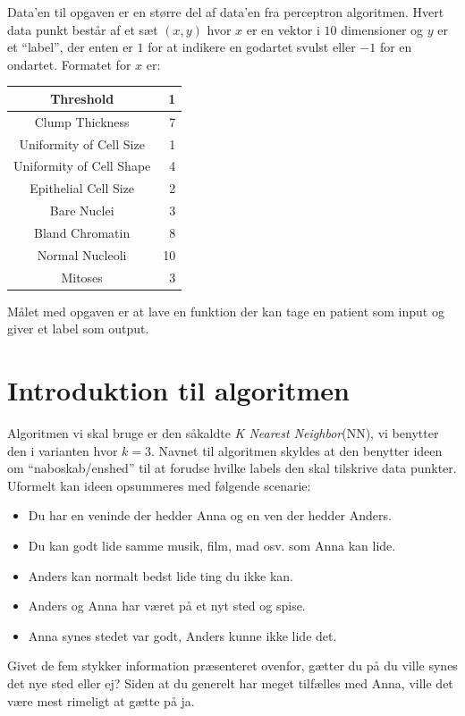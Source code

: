 \documentclass[14pt]{article}
\begin{document}
Data'en til opgaven er en større del af data'en fra perceptron algoritmen.
Hvert data punkt består af et sæt $(x, y)$ hvor $x$ er en vektor i $10$
dimensioner og $y$ er et ``label'', der enten er  $1$ for at indikere en
godartet svulst eller $-1$ for en ondartet. Formatet for $x$ er:
\begin{center}
    \begin{tabular}{| c | r |}
        \hline
        Threshold                & 1           \\ \hline
        Clump Thickness          & 7           \\ \hline
        Uniformity of Cell Size  & 1           \\ \hline
        Uniformity of Cell Shape & 4           \\ \hline
        Epithelial Cell Size     & 2           \\ \hline
        Bare Nuclei              & 3           \\ \hline
        Bland Chromatin          & 8           \\ \hline
        Normal Nucleoli          & 10          \\ \hline
        Mitoses                  & 3           \\ \hline
    \end{tabular}
\end{center}

Målet med opgaven er at lave en funktion der kan tage en patient som input og
giver et label som output.


\section*{Introduktion til algoritmen}
Algoritmen vi skal bruge er den såkaldte \emph{K Nearest Neighbor}(NN), vi
benytter den i varianten hvor $k=3$. Navnet til algoritmen skyldes at den
benytter ideen om ``naboskab/enshed'' til at forudse hvilke labels den skal
tilskrive data punkter. Uformelt kan ideen opsummeres med følgende scenarie:
\begin{itemize}
    \item Du har en veninde der hedder Anna og en ven der hedder Anders.
    \item Du kan godt lide samme musik, film, mad osv. som Anna kan lide.
    \item Anders kan normalt bedst lide ting du ikke kan.
    \item Anders og Anna har været på et nyt sted og spise.
    \item Anna synes stedet var godt, Anders kunne ikke lide det.
\end{itemize}
Givet de fem stykker information præsenteret ovenfor, gætter du på du ville
synes det nye sted eller ej? Siden at du generelt har meget tilfælles med Anna,
ville det være mest rimeligt at gætte på ja.
\end{document}

